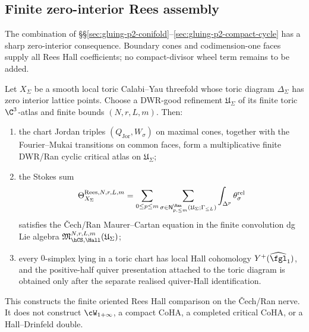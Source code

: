 \subsection{Finite zero-interior Rees assembly}
\label{sec:gluing-p2-local-to-global}

The combination of \S\S\ref{sec:gluing-p2-conifold}--\ref{sec:gluing-p2-compact-cycle}
has a sharp zero-interior consequence. Boundary cones and codimension-one
faces supply all Rees Hall coefficients; no compact-divisor wheel term
remains to be added.

\begin{proposition}
\label{prop:finite-zero-interior-toric-rees-assembly}
Let $X_\Sigma$ be a smooth local toric Calabi--Yau threefold whose toric
diagram $\Delta_\Sigma$ has zero interior lattice points. Choose a
DWR-good refinement $\mathfrak U_\Sigma$ of its finite toric
$\C^3$-atlas and finite bounds $(N,r,L,m)$. Then:
\begin{enumerate}[label=\emph{(\arabic*)}, leftmargin=2em]
\item the chart Jordan triples $(Q_{\mathrm{Jor}},W_\sigma)$ on maximal
 cones, together with the Fourier--Mukai transitions on common faces,
 form a multiplicative finite DWR/Ran cyclic critical atlas on
 $\mathfrak U_\Sigma$;
\item the Stokes sum
\[
 \Theta_{X_\Sigma}^{\mathrm{Rees},N,r,L,m}
 =
 \sum_{0\leq p\leq m}
 \sum_{\sigma\in
 \mathsf N^{\Ran}_{p,\leq m}(\mathfrak U_\Sigma;\Gamma_{\leq L})}
 \int_{\Delta^p}\theta_\sigma^{\mathrm{rel}}
\]
 satisfies the \v{C}ech/Ran Maurer--Cartan equation in the finite
 convolution dg Lie algebra
 $\mathfrak M_{\hCS,\Hall}^{N,r,L,m}(\mathfrak U_\Sigma)$;
\item every $0$-simplex lying in a toric chart has local Hall cohomology
 $Y^+(\widehat{\fgl}_1)$, and the positive-half quiver presentation
 attached to the toric diagram is obtained only after the separate
 realised quiver-Hall identification.
\end{enumerate}
This constructs the finite oriented Rees Hall comparison on the
\v{C}ech/Ran nerve. It does not construct $\cW_{1+\infty}$, a compact
CoHA, a completed critical CoHA, or a Hall--Drinfeld double.
\end{proposition}

